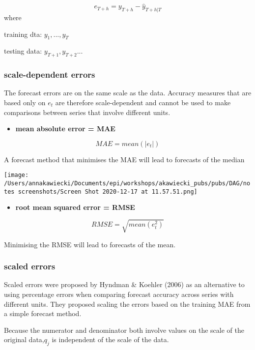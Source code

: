 \documentclass[
]{article}
\providecommand{\tightlist}{%
  \setlength{\itemsep}{0pt}\setlength{\parskip}{0pt}}
\begin{document}
\[e_{T+h}= y_{T+h} - \hat{y}_{T+h|T}\] where

training dta: \(y_1,...,y_T\)

testing data: \(y_{T+1},y_{T+2}...\)

\hypertarget{scale-dependent-errors}{%
\subsubsection{scale-dependent errors}\label{scale-dependent-errors}}

The forecast errors are on the same scale as the data. Accuracy measures
that are based only on \(e_{t}\) are therefore scale-dependent and
cannot be used to make comparisons between series that involve different
units.

\begin{itemize}
\tightlist
\item
  \textbf{mean absolute error = MAE}
\end{itemize}

\[MAE= mean(|e_{t}|)\]

A forecast method that minimises the MAE will lead to forecasts of the
median

\texttt{[image: /Users/annakawiecki/Documents/epi/workshops/akawiecki\_pubs/pubs/DAG/notes screenshots/Screen Shot 2020-12-17 at 11.57.51.png]}

\begin{itemize}
\tightlist
\item
  \textbf{root mean squared error = RMSE}
\end{itemize}

\[RMSE= \sqrt{mean(e_{t}^2)}\]

Minimising the RMSE will lead to forecasts of the mean.

\hypertarget{scaled-errors}{%
\subsubsection{scaled errors}\label{scaled-errors}}

Scaled errors were proposed by Hyndman \& Koehler (2006) as an
alternative to using percentage errors when comparing forecast accuracy
across series with different units. They proposed scaling the errors
based on the training MAE from a simple forecast method.

Because the numerator and denominator both involve values on the scale
of the original data,\(q_{j}\) is independent of the scale of the data.
\end{document}

